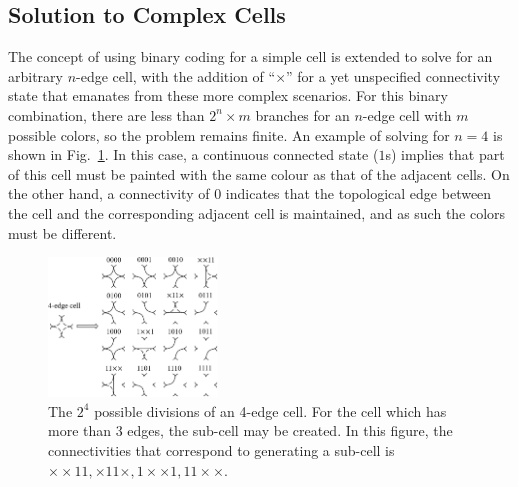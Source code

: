 \documentclass[journal]{IEEEtran}
\begin{document}
\subsection{Solution to Complex Cells}
The concept of using binary coding for a simple cell is extended to solve for an arbitrary $n$-edge cell, 
with the addition of ``$\times$'' for a yet unspecified connectivity state that emanates from these more complex scenarios. 
For this binary combination, there are less than $2^n\times m$ branches for an $n$-edge cell with $m$ possible colors, so the problem remains finite. 
An example of solving for $n=4$ is shown in Fig.~\ref{figeasycell4}.
In this case, a continuous connected state ($1$s) implies that part of this cell must be painted with the same colour as that of the adjacent cells. %
On the other hand, a connectivity of $0$ indicates that the topological edge between the cell and the corresponding adjacent cell is maintained, and as such the colors must be different. 

\begin{figure}[t]
\centering
\includegraphics[width = 0.4\textwidth]{figures/other_figures/cell4}
\caption{The $2^4$ possible divisions of an 4-edge cell. For the cell which has more than 3 edges, the sub-cell may be created. In this figure, the connectivities that correspond to generating a sub-cell is $\times\times11, \times11\times, 1\times\times1, 11\times\times$. }\label{figeasycell4}
\end{figure}
\end{document}
